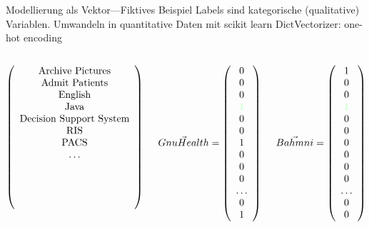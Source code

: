 \documentclass[aspectratio=1610]{beamer}
\newcommand{\both}[1]{{\color[rgb]{0.8,1,0.8}\textbf{#1}}}
\begin{document}
\begin{frame}{Modellierung als Vektor---Fiktives Beispiel}
Labels sind kategorische (qualitative) Variablen. Umwandeln in quantitative Daten mit scikit learn DictVectorizer: one-hot encoding
\begin{columns}
 
 \begin{column}{.4\textwidth}
   \[\left(\begin{array}{c} \textnormal{Archive Pictures} \\ \textnormal{Admit Patients} \\ \textnormal{English} \\ \textnormal{Java} \\ \textnormal{Decision Support System} \\ \textnormal{RIS} \\ \textnormal{PACS} \\ \dots \\ \\ \\ \\ \\ \end{array}\right) \]
 \end{column}
 
 \begin{column}{.25\textwidth}
   \[\vec{GnuHealth}	= \left(\begin{array}{c} 0 \\ 0 \\ 0 \\ \both{1} \\ 0 \\ 0 \\ 1 \\ 0 \\ 0 \\ 0 \\ \ldots \\ 0 \\ 1 \end{array}\right) \]
 \end{column}

 \begin{column}{.25\textwidth}
   \[\vec{Bahmni}		= \left(\begin{array}{c} 1 \\ 0 \\ 0 \\ \both{1} \\ 0 \\ 0 \\ 0 \\ 0 \\ 0 \\ 0 \\ \ldots \\ 0 \\ 0 \end{array}\right) \]
 \end{column}
\end{columns}

\end{frame}
\end{document}
